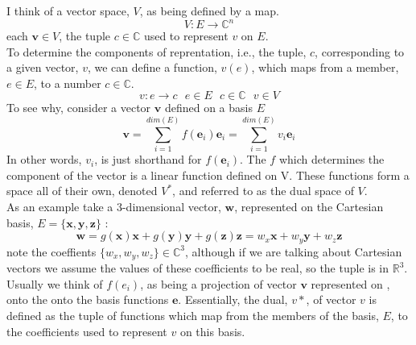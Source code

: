 \documentclass[12pt]{article}
\begin{document}
\noindent I think of a vector space, $V$, as being defined by a map.
\begin{equation}
V : E \rightarrow \mathbb{C}^{n}
\end{equation}
\noindent each $\mathbf{v} \in V$, the tuple $c\in \mathbb{C}$ used to represent
$v$ on $E$.\\

\noindent To determine the components of reprentation, i.e., the tuple, $c$, corresponding
to a given vector, $v$, we can define a function, $v(e)$,
which maps from a member, $e \in E$, to a number $c \in \mathbb{C}$.
\begin{equation}
v :  e \rightarrow c \text{ \  \  \ \ \ \ \ \ \ \ \ \ \ \ \ \ }  e\in E \text{ \ \ }c \in \mathbb{C} \text{\ \ \ } v \in V 
\end{equation}
\noindent To see why, consider a vector $\mathbf{v}$ defined on a basis $E$
\begin{equation}
\mathbf{v} = \sum_{i=1}^{dim(E)} f(\mathbf{e}_{i}) \mathbf{e}_{i} = \sum_{i=1}^{dim(E)} v_{i} \mathbf{e}_{i}
\end{equation}
\noindent In other words, $v_{i}$, is just shorthand for $f(\mathbf{e}_{i})$. 
The $f$ which determines the component of the vector is a linear function defined on 
V. These functions form a space all of their own, denoted $V^{*}$, and referred to as
the dual space of $V$.
\\

\noindent As an example take a 3-dimensional vector, $\mathbf{w}$, represented
on the Cartesian basis, $E = \{\mathbf{x},\mathbf{y},\mathbf{z}\}$ :
\begin{equation}
\mathbf{w} = g(\mathbf{x})\mathbf{x}+g(\mathbf{y})\mathbf{y}+g(\mathbf{z})\mathbf{z}
 = w_{x}\mathbf{x}+w_{y}\mathbf{y}+w_{z}\mathbf{z}
\end{equation}
\noindent note the coeffients $\{w_{x},w_{y},w_{z}\}\in \mathbb{C}^{3}$, although
if we are talking about Cartesian vectors we assume the values of these coefficients
to be real, so the tuple is in $\mathbb{R}^{3}$.\\

\noindent Usually we think of $f(e_{i})$, as being a projection of
vector $\mathbf{v}$ represented on , onto the onto the basis functions $\mathbf{e}$. 
Essentially, the dual, $v*$, of vector $v$ is defined as the tuple of functions which map 
from the members of the basis, $E$, to the coefficients used to represent $v$ on this basis.\\
\end{document}
